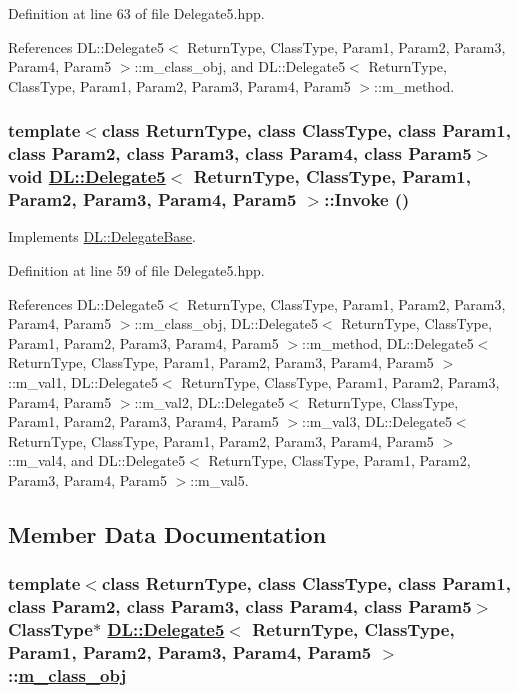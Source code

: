 Definition at line 63 of file Delegate5.hpp.

References DL::Delegate5$<$ Return\-Type, Class\-Type, Param1, Param2, Param3, Param4, Param5 $>$::m\_\-class\_\-obj, and DL::Delegate5$<$ Return\-Type, Class\-Type, Param1, Param2, Param3, Param4, Param5 $>$::m\_\-method.\hypertarget{classDL_1_1Delegate5_a2}{
\subsubsection[Invoke]{\setlength{\rightskip}{0pt plus 5cm}template$<$class Return\-Type, class Class\-Type, class Param1, class Param2, class Param3, class Param4, class Param5$>$ void \hyperlink{classDL_1_1Delegate5}{DL::Delegate5}$<$ Return\-Type, Class\-Type, Param1, Param2, Param3, Param4, Param5 $>$::Invoke ()}}
\label{classDL_1_1Delegate5_a2}




Implements \hyperlink{classDL_1_1DelegateBase_a2}{DL::Delegate\-Base}.

Definition at line 59 of file Delegate5.hpp.

References DL::Delegate5$<$ Return\-Type, Class\-Type, Param1, Param2, Param3, Param4, Param5 $>$::m\_\-class\_\-obj, DL::Delegate5$<$ Return\-Type, Class\-Type, Param1, Param2, Param3, Param4, Param5 $>$::m\_\-method, DL::Delegate5$<$ Return\-Type, Class\-Type, Param1, Param2, Param3, Param4, Param5 $>$::m\_\-val1, DL::Delegate5$<$ Return\-Type, Class\-Type, Param1, Param2, Param3, Param4, Param5 $>$::m\_\-val2, DL::Delegate5$<$ Return\-Type, Class\-Type, Param1, Param2, Param3, Param4, Param5 $>$::m\_\-val3, DL::Delegate5$<$ Return\-Type, Class\-Type, Param1, Param2, Param3, Param4, Param5 $>$::m\_\-val4, and DL::Delegate5$<$ Return\-Type, Class\-Type, Param1, Param2, Param3, Param4, Param5 $>$::m\_\-val5.

\subsection{Member Data Documentation}
\hypertarget{classDL_1_1Delegate5_r0}{
\subsubsection[m\_\-class\_\-obj]{\setlength{\rightskip}{0pt plus 5cm}template$<$class Return\-Type, class Class\-Type, class Param1, class Param2, class Param3, class Param4, class Param5$>$ Class\-Type$\ast$ \hyperlink{classDL_1_1Delegate5}{DL::Delegate5}$<$ Return\-Type, Class\-Type, Param1, Param2, Param3, Param4, Param5 $>$::\hyperlink{classDL_1_1Delegate5_r0}{m\_\-class\_\-obj}}}
\label{classDL_1_1Delegate5_r0}




